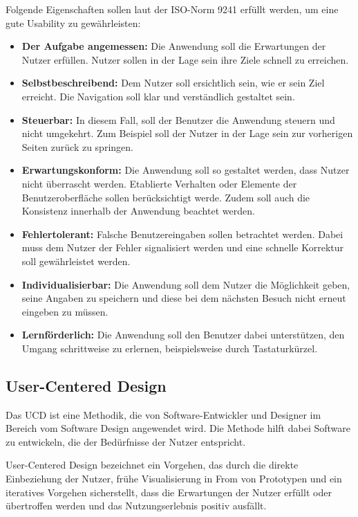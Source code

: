 Folgende Eigenschaften sollen laut der ISO-Norm 9241 \citep{ISO_standard} erfüllt werden, um eine gute Usability zu gewährleisten:

\begin{itemize}
	\item \textbf{Der Aufgabe angemessen:} Die Anwendung soll die Erwartungen der Nutzer erfüllen. Nutzer sollen in der Lage sein ihre Ziele schnell zu erreichen.
	\item \textbf{Selbstbeschreibend:} Dem Nutzer soll ersichtlich sein, wie er sein Ziel erreicht. Die Navigation soll klar und verständlich gestaltet sein.
	\item \textbf{Steuerbar:} In diesem Fall, soll der Benutzer die Anwendung steuern und nicht umgekehrt. Zum Beispiel soll der Nutzer in der Lage sein zur vorherigen Seiten zurück zu springen.
	\item \textbf{Erwartungskonform:} Die Anwendung soll so gestaltet werden, dass Nutzer nicht überrascht werden. Etablierte Verhalten oder Elemente der Benutzeroberfläche sollen berücksichtigt werde. Zudem soll auch die Konsistenz innerhalb der Anwendung beachtet werden.
	\item \textbf{Fehlertolerant:} Falsche Benutzereingaben sollen betrachtet werden. Dabei muss dem Nutzer der Fehler signalisiert werden und eine schnelle Korrektur soll gewährleistet werden.
	\item \textbf{Individualisierbar:} Die Anwendung soll dem Nutzer die Möglichkeit geben, seine Angaben zu speichern und diese bei dem nächsten Besuch nicht erneut eingeben zu müssen.
	\item \textbf{Lernförderlich:} Die Anwendung soll den Benutzer dabei unterstützen, den Umgang schrittweise zu erlernen, beispielsweise durch Tastaturkürzel.
\end{itemize}

\subsection{User-Centered Design}

Das \ac{UCD} ist eine Methodik, die von Software-Entwickler und Designer im Bereich vom Software Design angewendet wird. 
Die Methode hilft dabei Software zu entwickeln, die der Bedürfnisse der Nutzer entspricht. \citep[vgl.]{salinas_2020}

\begin{definition}

User-Centered Design bezeichnet ein Vorgehen, das durch die direkte Einbeziehung der Nutzer, frühe Visualisierung in From von Prototypen und ein iteratives Vorgehen sicherstellt, dass die Erwartungen der Nutzer erfüllt oder übertroffen werden und das Nutzungserlebnis positiv ausfällt. \citet{weichert_quick_2021}

\end{definition} 


